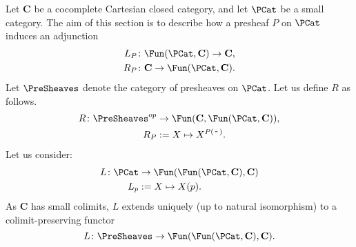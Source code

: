 \documentclass[12pt]{article}
\newcommand{\Cat}{{\mathbf{C}}}
\newcommand{\anon}{{\,\mbox{-}\,}}
\begin{document}
    Let $\Cat$ be a cocomplete Cartesian closed category, and let $\PCat$ be a small category.
    The aim of this section is to describe how a presheaf $P$ on $\PCat$ induces an adjunction
    \begin{align*}
        L_P &\colon \Fun(\PCat, \Cat) \rightarrow \Cat,\\
        R_P &\colon \Cat \rightarrow \Fun(\PCat, \Cat).
    \end{align*}
    Let $\PreSheaves$ denote the category of presheaves on $\PCat$. Let us define $R$ as follows.
    \begin{align*}
        R \colon \PreSheaves^{op} &\rightarrow \Fun(\Cat, \Fun(\PCat, \Cat)),\\
        R_P &:= X \mapsto X^{P(\anon)}.
    \end{align*}
    Let us consider:
    \begin{align*}
        L\colon \PCat &\rightarrow \Fun(\Fun(\PCat, \Cat), \Cat)\\
        L_p &:= X \mapsto X(p).
    \end{align*}
    As $\Cat$ has small colimits, $L$ extends uniquely (up to natural isomorphism) to a colimit-preserving functor
    \begin{equation*}
        L\colon \PreSheaves \rightarrow \Fun(\Fun(\PCat, \Cat), \Cat).
    \end{equation*}
\end{document}
